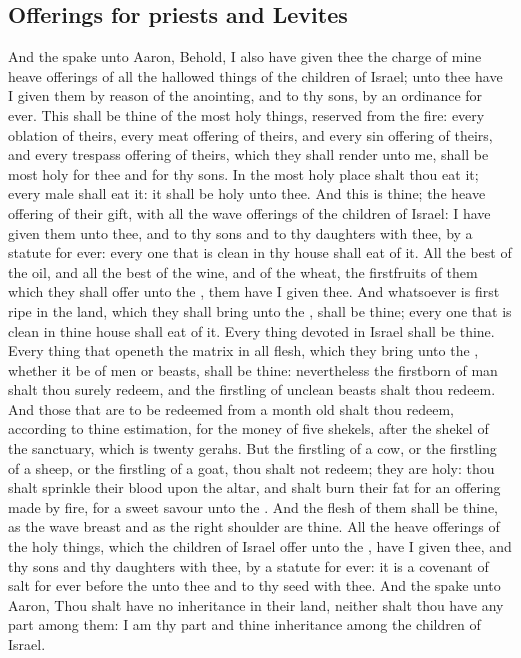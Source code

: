 \begin{biblechapter}
\section*{Offerings for priests and Levites}
\verse And the \LORD spake unto Aaron, Behold, I also have given thee the charge of mine heave offerings of all the hallowed things of the children of Israel; unto thee have I given them by reason of the anointing, and to thy sons, by an ordinance for ever.
\verse This shall be thine of the most holy things, reserved from the fire: every oblation of theirs, every meat offering of theirs, and every sin offering of theirs, and every trespass offering of theirs, which they shall render unto me, shall be most holy for thee and for thy sons.
\verse In the most holy place shalt thou eat it; every male shall eat it: it shall be holy unto thee.
\verse And this is thine; the heave offering of their gift, with all the wave offerings of the children of Israel: I have given them unto thee, and to thy sons and to thy daughters with thee, by a statute for ever: every one that is clean in thy house shall eat of it.
\verse All the best of the oil, and all the best of the wine, and of the wheat, the firstfruits of them which they shall offer unto the \LORD, them have I given thee.
\verse And whatsoever is first ripe in the land, which they shall bring unto the \LORD, shall be thine; every one that is clean in thine house shall eat of it.
\verse Every thing devoted in Israel shall be thine.
\verse Every thing that openeth the matrix in all flesh, which they bring unto the \LORD, whether it be of men or beasts, shall be thine: nevertheless the firstborn of man shalt thou surely redeem, and the firstling of unclean beasts shalt thou redeem.
\verse And those that are to be redeemed from a month old shalt thou redeem, according to thine estimation, for the money of five shekels, after the shekel of the sanctuary, which is twenty gerahs.
\verse But the firstling of a cow, or the firstling of a sheep, or the firstling of a goat, thou shalt not redeem; they are holy: thou shalt sprinkle their blood upon the altar, and shalt burn their fat for an offering made by fire, for a sweet savour unto the \LORD.
\verse And the flesh of them shall be thine, as the wave breast and as the right shoulder are thine.
\verse All the heave offerings of the holy things, which the children of Israel offer unto the \LORD, have I given thee, and thy sons and thy daughters with thee, by a statute for ever: it is a covenant of salt for ever before the \LORD unto thee and to thy seed with thee.
\verse And the \LORD spake unto Aaron, Thou shalt have no inheritance in their land, neither shalt thou have any part among them: I am thy part and thine inheritance among the children of Israel.

\end{biblechapter}
